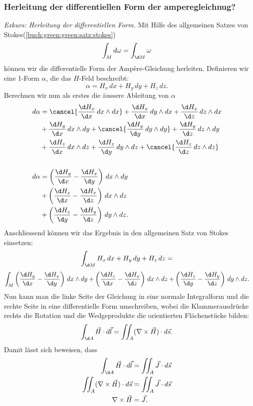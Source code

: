 \subsubsection{Herleitung der differentiellen Form der amperegleichnug?}
\textit{Exkurs: Herleitung der differentiellen Form.}
Mit Hilfe des allgemeinen Satzes von Stokes(\ref{buch:green:green:satz:stokes})
\[
\int_{M} d\omega
=
\int_{\d M} \omega
\]
können wir die differentielle Form der Ampère-Gleichung herleiten.
Definieren wir eine 1-Form $\alpha$, die das $H$-Feld beschreibt:
\[
\alpha
=
H_x \, dx + H_y \, dy + H_z \, dz . 
\]
Berechnen wir nun als erstes die äussere Ableitung von $\alpha$
\begin{align*}
	d\alpha 
	&=
	\cancel{\frac{\d H_x}{\d x} \, dx \wedge dx} + \frac{\d H_x}{\d x} \, dy \wedge dx + \frac{\d H_x}{\d z} \, dz \wedge dx
	\\
	&+
	\frac{\d H_y}{\d x} \, dx \wedge dy + \cancel{\frac{\d H_y}{\d y} \, dy \wedge dy} + \frac{\d H_y}{\d z} \, dz \wedge dy
	\\
	&+
	\frac{\d H_z}{\d x} \, dx \wedge dz + \frac{\d H_z}{\d y} \, dy \wedge dz + \cancel{\frac{\d H_z}{\d z} \, dz \wedge dz}
	\\
	\\
	d\alpha
	&=
	\left(\frac{\d H_y}{\d x} - \frac{\d H_x}{\d y}\right) \, dx \wedge dy
	\\
	&+
	\left(\frac{\d H_z}{\d x} - \frac{\d H_x}{\d z}\right) \, dx \wedge dz
	\\
	&+
	\left(\frac{\d H_z}{\d y} - \frac{\d H_y}{\d z}\right) \, dy \wedge dz .
\end{align*}
Anschliessend können wir das Ergebnis in den allgemeinen Satz von Stokes einsetzen:
\[
\int_{\d M} H_x \, dx + H_y \, dy + H_z \, dz
=
\]
\[
\int_{M} \left(\frac{\d H_y}{\d x} - \frac{\d H_x}{\d y}\right) \, dx \wedge dy
+
\left(\frac{\d H_z}{\d x} - \frac{\d H_x}{\d z}\right) \, dx \wedge dz
+
\left(\frac{\d H_z}{\d y} - \frac{\d H_y}{\d z}\right) \, dy \wedge dz .
\]
Nun kann man die linke Seite der Gleichung in eine normale Integralform und die rechte Seite in eine differentielle Form umschreiben, wobei die Klammerausdrücke rechts die Rotation und die Wedgeprodukte die orientierten Flächenstücke bilden: 
\[
\int_{\d A} \vec{H} \cdot d\vec{l}
=
\iint_{A} (\nabla \times \vec{H}) \cdot d\vec{s} .
\]
Damit lässt sich beweisen, dass
\begin{align*}
	\int_{\d A}
	\vec{H} \cdot d\vec{l}
	&=
	\iint_{A}
	\vec{J} \cdot d\vec{s}
	\\
	\iint_{A}
	(
	\nabla \times \vec{H}
	)
	\cdot
	d\vec{s}
	&=
	\iint_{A}
	\vec{J} \cdot d\vec{s}
	\\
	\nabla \times \vec{H}
	&=
	\vec{J} .
\end{align*}

